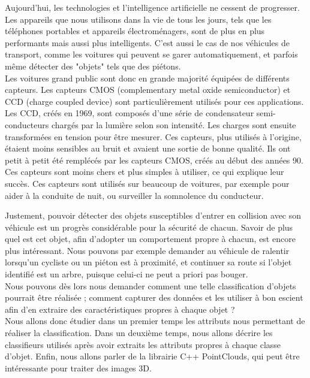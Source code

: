 Aujourd'hui, les technologies et l'intelligence artificielle ne cessent de progresser. Les appareils que nous utilisons dans la vie de tous les jours, tels que les téléphones portables et appareils électroménagers, sont de plus en plus performants mais aussi plus intelligents. C'est aussi le cas de nos véhicules de transport, comme les voitures qui peuvent se garer automatiquement, et parfois même détecter des "objets" tels que des piétons.\\

Les voitures grand public sont donc en grande majorité équipées de différents capteurs. Les capteurs CMOS (complementary metal oxide semiconductor) et CCD (charge coupled device) sont particulièrement utilisés pour ces applications. Les CCD, créés en 1969, sont composés d'une série de condensateur semi-conducteurs chargés par la lumière selon son intensité. Les charges sont ensuite transformées en tension pour être mesurer. Ces capteurs, plus utilisés à l'origine, étaient moins sensibles au bruit et avaient une sortie de bonne qualité. Ils ont petit à petit été remplécés par les capteurs CMOS, créés au début des années 90. Ces capteurs sont moins chers et plus simples à utiliser, ce qui explique leur succès. Ces capteurs sont utilisés sur beaucoup de voitures, par exemple pour aider à la conduite de nuit, ou surveiller la somnolence du conducteur.

Justement, pouvoir détecter des objets susceptibles d'entrer en collision avec son véhicule est un progrès considérable pour la sécurité de chacun. Savoir de plus quel est cet objet, afin d'adopter un comportement propre à chacun, est encore plus intéressant. Nous pouvons par exemple demander au véhicule de ralentir lorsqu'un cycliste ou un piéton est à proximité, et continuer sa route si l'objet identifié est un arbre, puisque celui-ci ne peut a priori pas bouger.\\

Nous pouvons dès lors nous demander comment une telle classification d'objets pourrait être réalisée ; comment capturer des données et les utiliser à bon escient afin d'en extraire des caractéristiques propres à chaque objet ?\\

Nous allons donc étudier dans un premier temps les attributs nous permettant de réaliser la classification. Dans un deuxième temps, nous allons décrire les classifieurs utilisés après avoir extraits les attributs propres à chaque classe d'objet. Enfin, nous allons parler de la librairie C++ PointClouds, qui peut être intéressante pour traiter des images 3D.\\